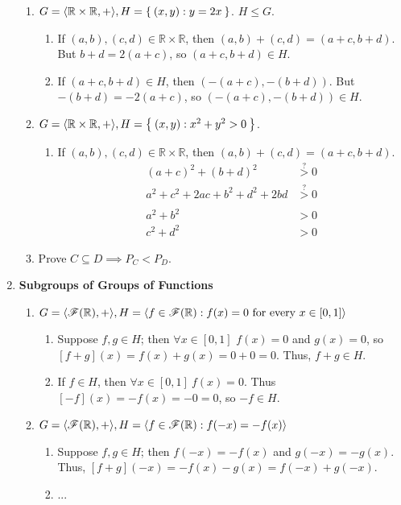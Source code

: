 \begin{enumerate}[label={\Alph*.},font={\bfseries}]
\begin{enumerate}[label={\arabic*},font={\bfseries}]
  \item $G = \langle\mathbb{R} \times \mathbb{R}, +\rangle, H = \Set{(x,y) : y = 2x}$.
    $H \le G$.
    \begin{enumerate}[label={(\roman*)}]
    \item If $(a,b), (c,d) \in \mathbb{R} \times \mathbb{R}$, then $(a,b) + (c,d) = (a+c,b+d)$.
      But $b+d = 2(a+c)$, so $(a+c,b+d) \in H$.
    \item If $(a+c,b+d) \in H$, then $(-(a+c),-(b+d))$. But $-(b+d) = -2(a+c)$, so $(-(a+c),-(b+d)) \in H$.
    \end{enumerate}
  \item $G = \langle\mathbb{R} \times \mathbb{R}, +\rangle, H = \Set{(x,y) : x^2 + y^2 > 0}$.
    \begin{enumerate}[label={(\roman*)}]
    \item If $(a,b), (c,d) \in \mathbb{R} \times \mathbb{R}$, then $(a,b) + (c,d) = (a+c,b+d)$.
      \begin{align*}
        (a+c)^2 + (b+d)^2 &\overset{?}{>} 0 \\
        a^2 + c^2 + 2ac + b^2 + d^2 + 2bd &\overset{?}{>} 0 \\
        \\
        a^2 + b^2 &> 0 \\
        c^2 + d^2 &> 0
      \end{align*}
    \end{enumerate}
  \item Prove $C \subseteq D \implies P_C < P_D$.
  \end{enumerate}
\item {\bf Subgroups of Groups of Functions}
  \begin{enumerate}[label={\arabic*},font={\bfseries}]
  \item $G = \langle\mathscr{F}(\mathbb{R}), +\rangle, H = \langle f \in \mathscr{F}(\mathbb{R}) : f(x) = 0\ \text{for every}\ x \in [0,1]\rangle$
    \begin{enumerate}[label={(\roman*)}]
    \item Suppose $f,g \in H$; then $\forall x \in [0,1]$ $f(x) = 0$ and $g(x) = 0$, so $[f+g](x) = f(x) + g(x) = 0 + 0 = 0$. Thus, $f + g \in H$.
    \item If $f \in H$, then $\forall x \in [0,1]\ f(x) = 0$. Thus $[-f](x) = -f(x) = -0 = 0$, so $-f \in H$.
    \end{enumerate}
  \item $G = \langle\mathscr{F}(\mathbb{R}), +\rangle, H = \langle f \in \mathscr{F}(\mathbb{R}) : f(-x) = -f(x)\rangle$
    \begin{enumerate}[label={(\roman*)}]
    \item Suppose $f,g \in H$; then $f(-x) = -f(x)$ and $g(-x) = -g(x)$. Thus, $[f+g](-x) = -f(x) - g(x) = f(-x) + g(-x)$.
    \item ...
    \end{enumerate}
  \end{enumerate}
\end{enumerate}

